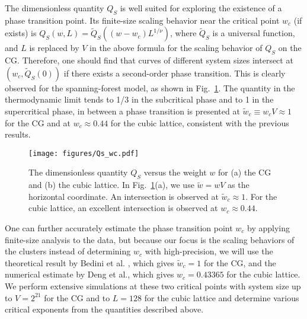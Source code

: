 The dimensionless quantity $Q_{S}$ is well suited for exploring the existence of a phase transition point.
Its finite-size scaling behavior near the critical point $w_c$ (if exists) is $Q_{S}(w, L) = \tilde{Q}_{S}\left((w-w_c) L^{1/\nu}\right)$,
where $\tilde{Q}_{S}$ is a universal function, and $L$ is replaced by $V$ in the above formula for the scaling behavior of $Q_S$ on the CG. 
Therefore, one should find that curves of different system sizes intersect
at $\left(w_c, \tilde{Q}_{S}(0)\right)$ if there exists a second-order phase transition. This is clearly observed for the spanning-forest model,
as shown in Fig.~\ref{fig:wc}. The quantity in the thermodynamic limit tends to 1/3 in the subcritical phase and to 1 in the supercritical phase,
in between a phase transition is presented at $\tilde{w}_c \equiv w_c V \approx 1$ for the CG and at $w_c \approx 0.44$ for the cubic lattice,
consistent with the previous results\cite{Luczak1992,Deng2007,Bedini2009,Roland2021Percolation}.

\begin{figure}[t]
	\centering
	\texttt{[image: figures/Qs\_wc.pdf]}
	\caption{The dimensionless quantity $Q_S$ versus the weight $w$ for (a) the CG and (b) the cubic lattice. 
	In Fig.~\ref{fig:wc}(a), we use $\tilde{w} = wV$ as the horizontal coordinate. An intersection is observed at $\tilde{w}_c \approx 1$. 
	For the cubic lattice, an excellent intersection is observed at $w_c \approx 0.44$. }
	\label{fig:wc}
\end{figure}

One can further accurately estimate the phase transition point $w_c$ by applying finite-size analysis to the data, but because our focus is the 
scaling behaviors of the clusters instead of determining $w_c$ with high-precision, we will use 
the theoretical result by Bedini et al. \cite{Bedini2009}, which gives $\tilde{w}_c = 1$ for the CG, and
the numerical estimate by Deng et al.\cite{Deng2007}, which gives $w_c = 0.43365$ for the cubic lattice. We perform extensive simulations at these
two critical points with system size up to $V = 2^{21}$ for the CG and to $L=128$ for the cubic lattice and determine various critical exponents from the quantities described above. 


